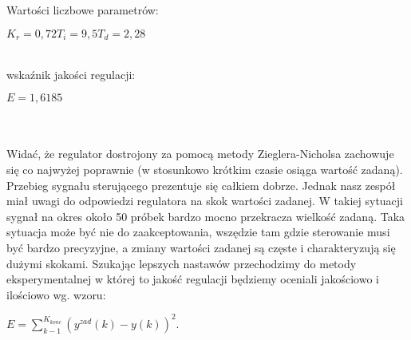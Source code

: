Wartości liczbowe parametrów:
\begin{center}
$K_{r}=0,72 T_{i}=9,5 T_{d}=2,28$
\end{center}
\\wskaźnik jakości regulacji:
\begin{center}
$E=1,6185$
\end{center}
\\\\Widać, że regulator dostrojony za pomocą metody Zieglera-Nicholsa zachowuje się co najwyżej poprawnie (w stosunkowo krótkim czasie osiąga wartość zadaną). Przebieg sygnału sterującego prezentuje się całkiem dobrze. Jednak nasz zespół miał uwagi do odpowiedzi regulatora na skok wartości zadanej. W takiej sytuacji sygnał na okres około 50 próbek bardzo mocno przekracza wielkość zadaną. Taka sytuacja może być nie do zaakceptowania, wszędzie tam gdzie sterowanie musi być bardzo precyzyjne, a zmiany wartości zadanej są częste i charakteryzują się dużymi skokami. Szukając lepszych nastawów przechodzimy do metody eksperymentalnej w której to jakość regulacji będziemy oceniali jakościowo i ilościowo wg. wzoru:
\begin{center}
$E=\sum_{k-1}^{K_{konc}}(y^{zad}(k)-y(k))^{2}$.
\end{center}



